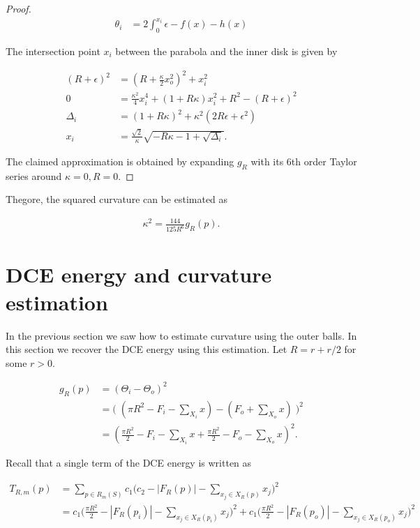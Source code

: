 \begin{proof}
\begin{align*}
	\theta_i &= 2\int_{0}^{x_i}{\epsilon - f(x) - h(x)}	\end{align*}

The intersection point $x_i$ between the parabola and the inner disk is given by
	
\begin{align*}
	(R+\epsilon)^2 &= (R+\frac{\kappa}{2}x_o^2)^2 + x_i^2\\
	0 &= \frac{\kappa^2}{4}x_i^4 + (1+R\kappa)x_i^2 + R^2 - (R+\epsilon)^2	\\
\Delta_i &= (1+R\kappa)^2 + \kappa^2(2R\epsilon + \epsilon^2)\\
x_i &= \frac{\sqrt{2}}{\kappa}\sqrt{-R\kappa-1+\sqrt{\Delta_i}}.
\end{align*}

The claimed approximation is obtained by expanding $g_R$ with its  6th order Taylor series around $\kappa=0,R=0$.
\end{proof}

Thegore, the squared curvature can be estimated as

\begin{align*}
	\kappa ^2 = \frac{144}{125R^6}g_R(p).
\end{align*}

\section{DCE energy and curvature estimation}

In the previous section we saw how to estimate curvature using the outer balls. In this section we recover the DCE energy using this estimation. Let $R=r+r/2$ for some $r>0$.

\begin{align*}
	g_{R}(p) &= ( \Theta_i - \Theta_o )^2 \\
		   &= \big(\; ( \pi R^2 - F_i - \sum_{X_i}{x} ) - (F_o + \sum_{X_o}{x}) \;\big)^2 \\
		   &= ( \frac{\pi R^2}{2} - F_i - \sum_{X_i}{x} + \frac{\pi R^2}{2} - F_o - \sum_{X_o}{x} )^2.
\end{align*}

Recall that a single term of the DCE energy is written as


\begin{align*}
  T_{R,m}(p) &=  \sum_{p \in R_m(S)}{ c_1\Big( c_2 - |F_{R}(p)| - \sum_{x_j \in X_R(p)} {x_j} \Big)^2 } \\
  	  &= c_1\Big( \frac{\pi R^2}{2} - |F_{R}(p_i)| - \sum_{x_j \in X_{R}(p_{i})} {x_j} \Big)^2 + c_1\Big( \frac{\pi R^2}{2} - |F_{R}(p_o)| - \sum_{x_j \in X_{R}(p_{o})} {x_j} \Big)^2
\end{align*}


